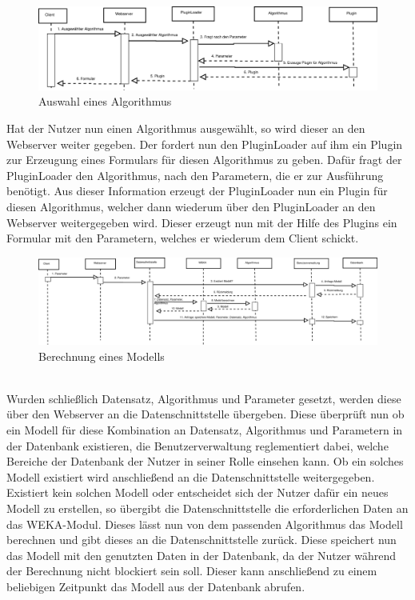 \begin{figure}[h]
	\hspace{-0.25\linewidth}\includegraphics[width=1.5\linewidth]{Grafik/Diagramm/Szenarios/Berechnung2}
	\caption[]{Auswahl eines Algorithmus}
\end{figure}
\noindent Hat der Nutzer nun einen Algorithmus ausgewählt, so wird dieser an den Webserver weiter gegeben. Der fordert nun den PluginLoader auf ihm ein Plugin zur Erzeugung eines Formulars für diesen Algorithmus zu geben. Dafür fragt der PluginLoader den Algorithmus, nach den Parametern, die er zur Ausführung benötigt. Aus dieser Information erzeugt der PluginLoader nun ein Plugin für diesen Algorithmus, welcher dann wiederum über den PluginLoader an den Webserver weitergegeben wird. Dieser erzeugt nun mit der Hilfe des Plugins ein Formular mit den Parametern, welches er wiederum dem Client schickt.
\pagebreak
\begin{figure}
	\vspace{-80pt}
	\begin{center}
		\includegraphics[width =1\textheight, angle=90 ]{Grafik/Diagramm/Szenarios/Berechnung3}
	\end{center}
	\vspace{-15pt}
	\caption[]{Berechnung eines Modells}
	\label{fig:Berechnung3}
	\vspace{-70pt}
\end{figure}\\
Wurden schließlich Datensatz, Algorithmus und Parameter gesetzt, werden diese über den Webserver an die Datenschnittstelle übergeben. Diese überprüft nun ob ein Modell für diese Kombination an Datensatz, Algorithmus und Parametern in der Datenbank existieren, die Benutzerverwaltung reglementiert dabei, welche Bereiche der Datenbank der Nutzer in seiner Rolle einsehen kann. Ob ein solches Modell existiert wird anschließend an die Datenschnittstelle weitergegeben. Existiert kein solchen Modell oder entscheidet sich der Nutzer dafür ein neues Modell zu erstellen, so übergibt die Datenschnittstelle die erforderlichen Daten an das WEKA-Modul. Dieses lässt nun von dem passenden Algorithmus das Modell berechnen und gibt dieses an die Datenschnittstelle zurück. Diese speichert nun das Modell mit den genutzten Daten in der Datenbank, da der Nutzer während der Berechnung nicht blockiert sein soll. Dieser kann anschließend zu einem beliebigen Zeitpunkt das Modell aus der Datenbank abrufen.